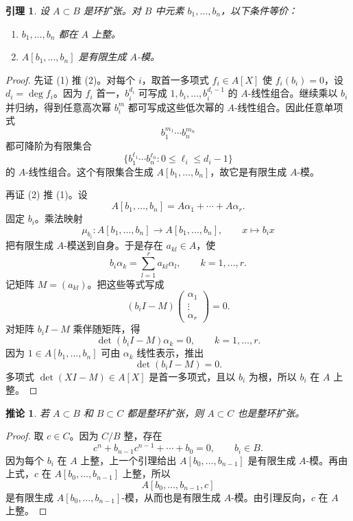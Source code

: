\documentclass[11pt,a4paper,openany]{ctexbook}
\numberwithin{equation}{chapter}
\theoremstyle{plain}
\newtheorem{lemma}[theorem]{引理}
\newtheorem{corollary}[theorem]{推论}
\theoremstyle{definition}
\theoremstyle{remark}
\begin{document}
\begin{lemma}
设 $A\subset B$ 是环扩张。对 $B$ 中元素 $b_1,\dots,b_n$，以下条件等价：
\begin{enumerate}[label=(\arabic*)]
\item $b_1,\dots,b_n$ 都在 $A$ 上整。
\item $A[b_1,\dots,b_n]$ 是有限生成 $A$-模。
\end{enumerate}
\end{lemma}

\begin{proof}
先证 (1) 推 (2)。对每个 $i$，取首一多项式 $f_i\in A[X]$ 使 $f_i(b_i)=0$，设 $d_i=\deg f_i$。因为 $f_i$ 首一，$b_i^{d_i}$ 可写成 $1,b_i,\dots,b_i^{d_i-1}$ 的 $A$-线性组合。继续乘以 $b_i$ 并归纳，得到任意高次幂 $b_i^m$ 都可写成这些低次幂的 $A$-线性组合。因此任意单项式
\[
b_1^{m_1}\cdots b_n^{m_n}
\]
都可降阶为有限集合
\[
\{b_1^{\ell_1}\cdots b_n^{\ell_n}:0\le \ell_i\le d_i-1\}
\]
的 $A$-线性组合。这个有限集合生成 $A[b_1,\dots,b_n]$，故它是有限生成 $A$-模。

再证 (2) 推 (1)。设
\[
A[b_1,\dots,b_n]=A\alpha_1+\cdots+A\alpha_r.
\]
固定 $b_i$。乘法映射
\[
\mu_{b_i}:A[b_1,\dots,b_n]\to A[b_1,\dots,b_n],\qquad x\mapsto b_ix
\]
把有限生成 $A$-模送到自身。于是存在 $a_{kl}\in A$，使
\[
b_i\alpha_k=\sum_{l=1}^r a_{kl}\alpha_l,\qquad k=1,\dots,r.
\]
记矩阵 $M=(a_{kl})$。把这些等式写成
\[
(b_iI-M)
\begin{pmatrix}
\alpha_1\\ \vdots\\ \alpha_r
\end{pmatrix}=0.
\]
对矩阵 $b_iI-M$ 乘伴随矩阵，得
\[
\det(b_iI-M)\alpha_k=0,\qquad k=1,\dots,r.
\]
因为 $1\in A[b_1,\dots,b_n]$ 可由 $\alpha_k$ 线性表示，推出
\[
\det(b_iI-M)=0.
\]
多项式 $\det(XI-M)\in A[X]$ 是首一多项式，且以 $b_i$ 为根，所以 $b_i$ 在 $A$ 上整。
\end{proof}

\begin{corollary}
若 $A\subset B$ 和 $B\subset C$ 都是整环扩张，则 $A\subset C$ 也是整环扩张。
\end{corollary}

\begin{proof}
取 $c\in C$。因为 $C/B$ 整，存在
\[
c^n+b_{n-1}c^{n-1}+\cdots+b_0=0,\qquad b_i\in B.
\]
因为每个 $b_i$ 在 $A$ 上整，上一个引理给出 $A[b_0,\dots,b_{n-1}]$ 是有限生成 $A$-模。再由上式，$c$ 在 $A[b_0,\dots,b_{n-1}]$ 上整，所以
\[
A[b_0,\dots,b_{n-1},c]
\]
是有限生成 $A[b_0,\dots,b_{n-1}]$-模，从而也是有限生成 $A$-模。由引理反向，$c$ 在 $A$ 上整。
\end{proof}
\end{document}
